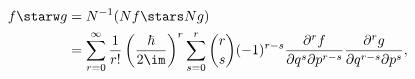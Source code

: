 \begin{equation}
    \label{eq:starwexpl}
    \begin{split}
        f \starw g 
        &= N^{-1} (Nf \stars Ng) \\
        &=
        \sum_{r=0}^\infty \frac{1}{r!}
        \left(\frac{\hbar}{2\im}\right)^r
        \sum_{s=0}^r \binom{r}{s} (-1)^{r-s}
        \frac{\partial^r f}{\partial q^s \partial p^{r-s}}
        \frac{\partial^r g}{\partial q^{r-s} \partial p^s},
    \end{split}
\end{equation}

